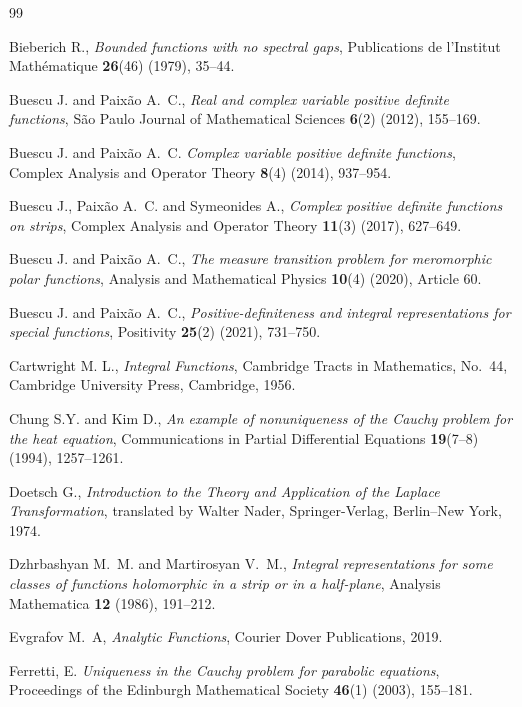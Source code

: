 \documentclass[12pt]{article}
\theoremstyle{definition}
\begin{document}
\begin{thebibliography}{99}

Bieberich R., \textit{Bounded functions with no spectral gaps}, Publications de l'Institut Mathématique \textbf{26}(46) (1979), 35–44.

Buescu J. and Paixão A.~C., \textit{Real and complex variable positive definite functions}, São Paulo Journal of Mathematical Sciences \textbf{6}(2) (2012), 155–169.

Buescu J. and Paixão A.~C. \textit{Complex variable positive definite functions}, Complex Analysis and Operator Theory \textbf{8}(4) (2014), 937–954.

Buescu J., Paixão A.~C. and Symeonides A., \textit{Complex positive definite functions on strips}, Complex Analysis and Operator Theory \textbf{11}(3) (2017), 627–649.

Buescu J. and Paixão A.~C., \textit{The measure transition problem for meromorphic polar functions}, Analysis and Mathematical Physics \textbf{10}(4) (2020), Article 60.

Buescu J. and Paixão A.~C., \textit{Positive-definiteness and integral representations for special functions}, Positivity \textbf{25}(2) (2021), 731–750.

Cartwright M. L., \textit{Integral Functions}, Cambridge Tracts in Mathematics, No.~44, Cambridge University Press, Cambridge, 1956.

Chung S.Y. and Kim D., \textit{An example of nonuniqueness of the Cauchy problem for the heat equation}, Communications in Partial Differential Equations \textbf{19}(7–8) (1994), 1257–1261.

Doetsch G., \textit{Introduction to the Theory and Application of the Laplace Transformation}, translated by Walter Nader, Springer-Verlag, Berlin--New York, 1974.

Dzhrbashyan M.~M.  and  Martirosyan V.~M., \textit{Integral representations for some classes of functions holomorphic in a strip or in a half-plane}, Analysis Mathematica \textbf{12} (1986), 191–212.

Evgrafov M.~A, \textit{Analytic Functions}, Courier Dover Publications, 2019.

Ferretti, E. \textit{Uniqueness in the Cauchy problem for parabolic equations}, Proceedings of the Edinburgh Mathematical Society \textbf{46}(1) (2003), 155--181.


\end{thebibliography}
\end{document}
